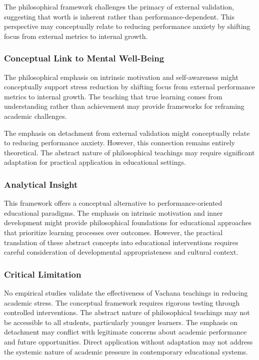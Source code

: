 \documentclass[12pt,a4paper,twocolumn]{article}
\begin{document}
The philosophical framework challenges the primacy of external validation, suggesting that worth is inherent rather than performance-dependent. This perspective may conceptually relate to reducing performance anxiety by shifting focus from external metrics to internal growth.

\subsubsection{Conceptual Link to Mental Well-Being}

The philosophical emphasis on intrinsic motivation and self-awareness might conceptually support stress reduction by shifting focus from external performance metrics to internal growth. The teaching that true learning comes from understanding rather than achievement may provide frameworks for reframing academic challenges.

The emphasis on detachment from external validation might conceptually relate to reducing performance anxiety. However, this connection remains entirely theoretical. The abstract nature of philosophical teachings may require significant adaptation for practical application in educational settings.

\subsubsection{Analytical Insight}

This framework offers a conceptual alternative to performance-oriented educational paradigms. The emphasis on intrinsic motivation and inner development might provide philosophical foundations for educational approaches that prioritize learning processes over outcomes. However, the practical translation of these abstract concepts into educational interventions requires careful consideration of developmental appropriateness and cultural context.

\subsubsection{Critical Limitation}

No empirical studies validate the effectiveness of Vachana teachings in reducing academic stress. The conceptual framework requires rigorous testing through controlled interventions. The abstract nature of philosophical teachings may not be accessible to all students, particularly younger learners. The emphasis on detachment may conflict with legitimate concerns about academic performance and future opportunities. Direct application without adaptation may not address the systemic nature of academic pressure in contemporary educational systems.
\end{document}
